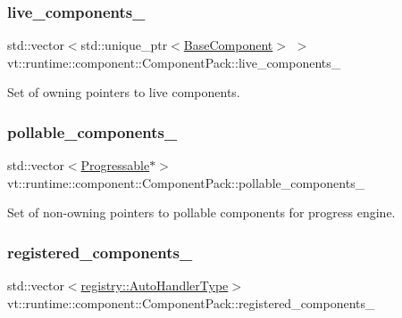 \subsubsection{\texorpdfstring{live\+\_\+components\+\_\+}{live\_components\_}}
{\footnotesize\ttfamily std\+::vector$<$std\+::unique\+\_\+ptr$<$\hyperlink{structvt_1_1runtime_1_1component_1_1_base_component}{Base\+Component}$>$ $>$ vt\+::runtime\+::component\+::\+Component\+Pack\+::live\+\_\+components\+\_\+\hspace{0.3cm}{\ttfamily [private]}}



Set of owning pointers to live components. 

\mbox{\label{structvt_1_1runtime_1_1component_1_1_component_pack_a1ef5fa947ed75d4451289e70732374cb}} 
\subsubsection{\texorpdfstring{pollable\+\_\+components\+\_\+}{pollable\_components\_}}
{\footnotesize\ttfamily std\+::vector$<$\hyperlink{structvt_1_1runtime_1_1component_1_1_progressable}{Progressable}$\ast$$>$ vt\+::runtime\+::component\+::\+Component\+Pack\+::pollable\+\_\+components\+\_\+\hspace{0.3cm}{\ttfamily [private]}}



Set of non-\/owning pointers to pollable components for progress engine. 

\mbox{\label{structvt_1_1runtime_1_1component_1_1_component_pack_a615b981d265458c952406691c89ce0f6}} 
\subsubsection{\texorpdfstring{registered\+\_\+components\+\_\+}{registered\_components\_}}
{\footnotesize\ttfamily std\+::vector$<$\hyperlink{namespacevt_1_1runtime_1_1component_1_1registry_a9b86518797c7bb91babf0ca8ee7d06e6}{registry\+::\+Auto\+Handler\+Type}$>$ vt\+::runtime\+::component\+::\+Component\+Pack\+::registered\+\_\+components\+\_\+\hspace{0.3cm}{\ttfamily [private]}}



